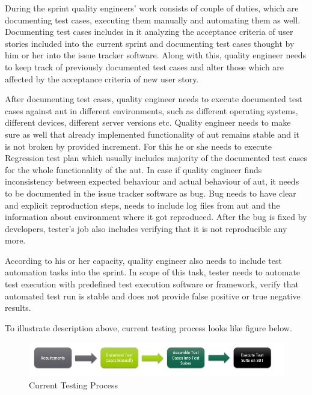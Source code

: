 \par
During the sprint quality engineers' work consists of couple of duties, which are documenting test cases, executing them manually and automating them as well. 
Documenting test cases includes in it analyzing the acceptance criteria of user stories included into the current sprint and documenting test cases thought by him or her into the issue tracker software. Along with this, quality engineer needs to keep track of previously documented test cases and alter those which are affected by the acceptance criteria of new user story.

\par
After documenting test cases, quality engineer needs to execute documented test cases against \acrlong{aut} in different environments, such as different operating systems, different devices, different server versions etc. Quality engineer needs to make sure as well that already implemented functionality of \acrlong{aut} remains stable and it is not broken by provided increment. For this he or she needs to execute Regression test plan which usually includes majority of the documented test cases for the whole functionality of the \acrlong{aut}. In case if quality engineer finds inconsistency between expected behaviour and actual behaviour of \acrlong{aut}, it needs to be documented in the issue tracker software as bug. Bug needs to have clear and explicit reproduction steps, needs to include log files from \acrlong{aut} and the information about environment where it got reproduced. After the bug is fixed by developers, tester's job also includes verifying that it is not reproducible any more.

\par
According to his or her capacity, quality engineer also needs to include test automation tasks into the sprint. In scope of this task, tester needs to automate test execution with predefined test execution software or framework, verify that automated test run is stable and does not provide false positive or true negative results.

\par
To illustrate description above, current testing process looks like figure below.

\begin{figure} [htbp!]
	\centering
					\includegraphics[width=1.1\textwidth]{figures/current_testing_process_flow.JPG}
					\caption{\label{Fig:current_testing_process_flow} Current Testing Process}
\end{figure}

